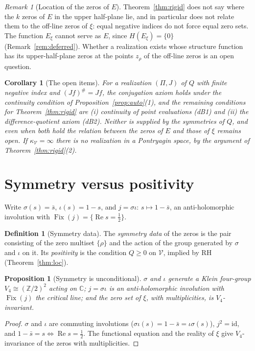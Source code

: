 \documentclass[11pt]{amsart}
\newtheorem{proposition}[theorem]{Proposition}
\newtheorem{corollary}[theorem]{Corollary}
\theoremstyle{definition}
\newtheorem{definition}[theorem]{Definition}
\theoremstyle{remark}
\newtheorem{remark}[theorem]{Remark}
\newcommand{\RH}{\mathrm{RH}}
\renewcommand{\Re}{\operatorname{Re}}
\newcommand{\half}{\tfrac12}
\newcommand{\Fix}{\operatorname{Fix}}
\newcommand{\kV}{\kappa_{\mathcal V}}
\begin{document}
\begin{remark}[Location of the zeros of $E$]\label{rem:identify}
Theorem~\ref{thm:rigid} does not say where the $k$ zeros of $E$ in the upper half-plane lie, and
in particular does not relate them to the off-line zeros of $\xi$: equal negative indices do not
force equal zero sets. The function $E_\xi$ cannot serve as $E$, since $H(E_\xi)=\{0\}$
(Remark~\ref{rem:deferred}). Whether a realization exists whose structure function has its
upper-half-plane zeros at the points $z_\rho$ of the off-line zeros is an open question.
\end{remark}

\begin{corollary}[The open items]\label{cor:freedom}
For a realization $(\Pi,J)$ of $Q$ with finite negative index and $(Jf)^\#=Jf$, the conjugation
axiom holds under the continuity condition of Proposition~\ref{prop:auto}(1), and the remaining
conditions for Theorem~\ref{thm:rigid} are \textnormal{(i)} continuity of point evaluations
\textnormal{(dB1)} and \textnormal{(ii)} the difference-quotient axiom \textnormal{(dB2)}. Neither
is supplied by the symmetries of $Q$, and even when both hold the relation between the zeros of
$E$ and those of $\xi$ remains open. If $\kV=\infty$ there is no realization in a Pontryagin
space, by the argument of Theorem~\ref{thm:rigid}(2).
\end{corollary}

\section{Symmetry versus positivity}\label{sec:dichotomy}

Write $\sigma(s)=\bar s$, $\iota(s)=1-s$, and $j=\sigma\iota:\,s\mapsto1-\bar s$, an
anti-holomorphic involution with $\Fix(j)=\{\Re s=\half\}$.

\begin{definition}[Symmetry data]\label{def:real}
The \emph{symmetry data} of the zeros is the pair consisting of the zero multiset
$\{\rho\}$ and the action of the group generated by $\sigma$ and $\iota$ on it. Its
\emph{positivity} is the condition $Q\ge0$ on $\mathcal V$, implied by $\RH$
(Theorem~\ref{thm:loc}).
\end{definition}

\begin{proposition}[Symmetry is unconditional]\label{prop:sym}
$\sigma$ and $\iota$ generate a Klein four-group $V_4\cong(\mathbb Z/2)^2$ acting on $\mathbb C$;
$j=\sigma\iota$ is an anti-holomorphic involution with $\Fix(j)$ the critical line; and the zero
set of $\xi$, with multiplicities, is $V_4$-invariant.
\end{proposition}
\begin{proof}
$\sigma$ and $\iota$ are commuting involutions ($\sigma\iota(s)=1-\bar s=\iota\sigma(s)$),
$j^2=\mathrm{id}$, and $1-\bar s=s\iff\Re s=\half$. The functional equation and the reality of
$\xi$ give $V_4$-invariance of the zeros with multiplicities.
\end{proof}
\end{document}
